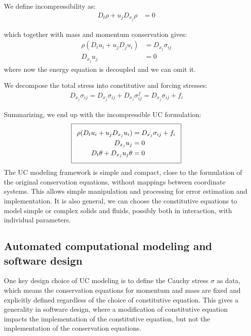 We define incompressibility as:
\begin{align*}
D_t \rho + u_j D_{x_j} \rho &= 0
\end{align*}

which together with mass and momentum conservation gives:
\begin{align*}
\rho(D_t u_i + u_j D_j u_i) &= D_{x_j} \sigma_{ij}\\
D_{x_j} u_j &= 0
\end{align*}
where now the energy equation is decoupled and we can omit it.

We decompose the total stress into constitutive and forcing stresses:
\begin{align*}
D_{x_j} \sigma_{ij} = D_{x_j} \sigma_{ij} + D_{x_j} \sigma^f_{ij} =
D_{x_j} \sigma_{ij} + f_i
\end{align*}

Summarizing, we end up with the incompressible UC formulation:
\begin{equation}
  \addtolength{\fboxsep}{5pt}
  \boxed{
    \begin{split}\label{eq:TotalUC}
      \rho(D_t u_i + u_j D_{x_j} u_i) &= D_{x_j} \sigma_{ij} + f_i\\
      D_{x_j} u_j &= 0\\
      D_t \theta + D_{x_j} u_j \theta &= 0
    \end{split}
  }
\end{equation}
The UC modeling framework is simple and compact, close to the
formulation of the original conservation equations, without mappings
between coordinate systems. This allows simple manipulation and
processing for error estimation and implementation. It is also
general, we can choose the constitutive equations to model simple or
complex solids and fluids, possibly both in interaction, with
individual parameters.

\subsection{Automated computational modeling and software design}

One key design choice of UC modeling is to define the Cauchy stress
$\sigma$ as data, which means the conservation equations for momentum
and mass are fixed and explicitly defined regardless of the choice of
constitutive equation. This gives a generality in software design,
where a modification of constitutive equation impacts the
implementation of the constitutive equation, but not the
implementation of the conservation equations.

